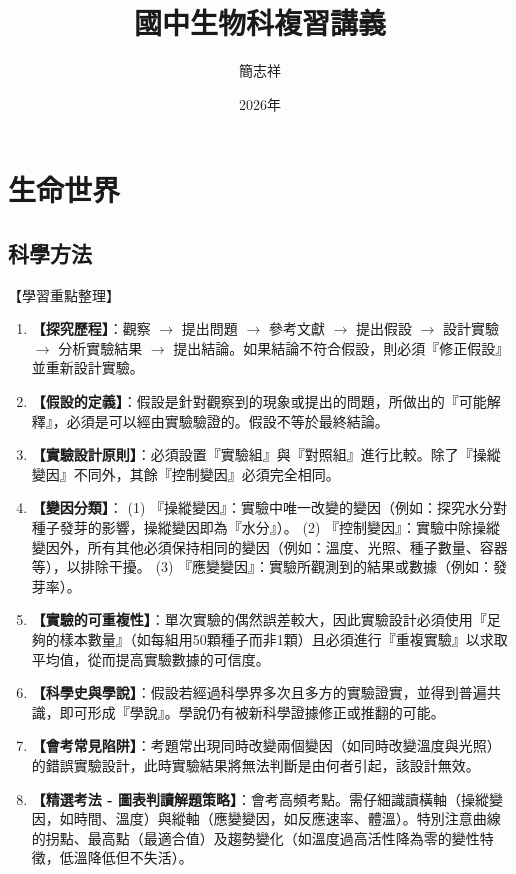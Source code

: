 \documentclass[11pt,a4paper]{article}
\begin{document}
\title{\Huge\bfseries\sffamily 國中生物科複習講義}
\author{\large 簡志祥}
\date{2026年}
\maketitle

\tableofcontents
\newpage
\section{生命世界}
\subsection{科學方法}
\begin{learningpoints}{【學習重點整理】}
\begin{enumerate}[label=\arabic*.]
  \item \textbf{【探究歷程】}：觀察 $\rightarrow$ 提出問題 $\rightarrow$ 參考文獻 $\rightarrow$ 提出假設 $\rightarrow$ 設計實驗 $\rightarrow$ 分析實驗結果 $\rightarrow$ 提出結論。如果結論不符合假設，則必須『修正假設』並重新設計實驗。
  \item \textbf{【假設的定義】}：假設是針對觀察到的現象或提出的問題，所做出的『可能解釋』，必須是可以經由實驗驗證的。假設不等於最終結論。
  \item \textbf{【實驗設計原則】}：必須設置『實驗組』與『對照組』進行比較。除了『操縱變因』不同外，其餘『控制變因』必須完全相同。
  \item \textbf{【變因分類】}：
  (1) 『操縱變因』：實驗中唯一改變的變因（例如：探究水分對種子發芽的影響，操縱變因即為『水分』）。
  (2) 『控制變因』：實驗中除操縱變因外，所有其他必須保持相同的變因（例如：溫度、光照、種子數量、容器等），以排除干擾。
  (3) 『應變變因』：實驗所觀測到的結果或數據（例如：發芽率）。
  \item \textbf{【實驗的可重複性】}：單次實驗的偶然誤差較大，因此實驗設計必須使用『足夠的樣本數量』（如每組用50顆種子而非1顆）且必須進行『重複實驗』以求取平均值，從而提高實驗數據的可信度。
  \item \textbf{【科學史與學說】}：假設若經過科學界多次且多方的實驗證實，並得到普遍共識，即可形成『學說』。學說仍有被新科學證據修正或推翻的可能。
  \item \textbf{【會考常見陷阱】}：考題常出現同時改變兩個變因（如同時改變溫度與光照）的錯誤實驗設計，此時實驗結果將無法判斷是由何者引起，該設計無效。
  \item \textbf{【精選考法 - 圖表判讀解題策略】}：會考高頻考點。需仔細識讀橫軸（操縱變因，如時間、溫度）與縱軸（應變變因，如反應速率、體溫）。特別注意曲線的拐點、最高點（最適合值）及趨勢變化（如溫度過高活性降為零的變性特徵，低溫降低但不失活）。
\end{enumerate}
\end{learningpoints}
\end{document}
